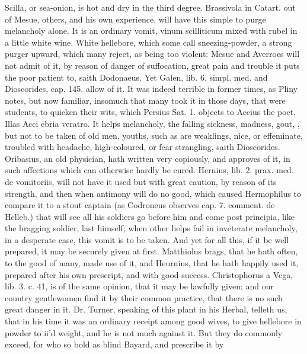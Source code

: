 {Scilla, or sea-onion, is hot and dry in the third degree. Brassivola in
Catart. out of Mesue, others, and his own experience, will have this
simple to purge melancholy alone. It is an ordinary vomit, vinum
scilliticum mixed with rubel in a little white wine.
White hellebore, which some call sneezing-powder, a strong purger
upward, which many reject, as being too violent: Mesue and Averroes
will not admit of it, by reason of danger of suffocation,
great pain and trouble it puts the poor patient to, saith
Dodonaeus. Yet Galen, lib. 6. simpl. med. and Dioscorides, cap. 145.
allow of it. It was indeed  terrible in former times, as Pliny
notes, but now familiar, insomuch that many took it in those days,
that were students, to quicken their wits, which Persius Sat. 1.
objects to Accius the poet, Illas Acci ebria veratro. It helps
melancholy, the falling sickness, madness, gout, \etc{}, but not to be
taken of old men, youths, such as are weaklings, nice, or effeminate,
troubled with headache, high-coloured, or fear strangling, saith
Dioscorides. Oribasius, an old physician, hath written very
copiously, and approves of it, in such affections which can otherwise
hardly be cured. Hernius, lib. 2. prax. med. de vomitoriis, will not
have it used but with great caution, by reason of its strength,
and then when antimony will do no good, which caused Hermophilus to
compare it to a stout captain (as Codroneus observes cap. 7. comment.
de Helleb.) that will see all his soldiers go before him and come post
principia, like the bragging soldier, last himself; when other
helps fail in inveterate melancholy, in a desperate case, this vomit is
to be taken. And yet for all this, if it be well prepared, it may be
 securely given at first. Matthiolus brags, that he hath
often, to the good of many, made use of it, and Heurnius, that he
hath happily used it, prepared after his own prescript, and with good
success. Christophorus a Vega, lib. 3. c. 41, is of the same opinion,
that it may be lawfully given; and our country gentlewomen find it by
their common practice, that there is no such great danger in it. Dr.
Turner, speaking of this plant in his Herbal, telleth us, that in his
time it was an ordinary receipt among good wives, to give hellebore in
powder to ii'd weight, and he is not much against it. But they do
commonly exceed, for who so bold as blind Bayard, and prescribe it by
}
